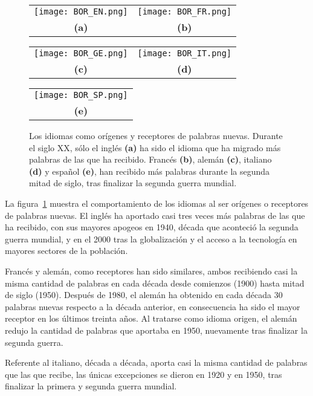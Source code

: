 \begin{figure} %
	\centering
	\begin{tabular}{cc}
		\texttt{[image: BOR\_EN.png]} &
		\texttt{[image: BOR\_FR.png]} \\
		\textbf{(a)} & \textbf{(b)}   \\
	\end{tabular}

	\begin{tabular}{cc}
		\texttt{[image: BOR\_GE.png]} &
		\texttt{[image: BOR\_IT.png]} \\
		\textbf{(c)}  & \textbf{(d)}   \\
	\end{tabular}
	\begin{tabular}{c}
		\texttt{[image: BOR\_SP.png]} \\
		\textbf{(e)} \\
	\end{tabular}
	\caption{Los idiomas como orígenes y receptores de palabras nuevas.
	Durante el siglo XX, sólo el inglés \textbf{(a)} ha sido el idioma que
	ha migrado más palabras de las que ha recibido. Francés \textbf{(b)},
	alemán \textbf{(c)}, italiano \textbf{(d)} y español \textbf{(e)}, han
	recibido más palabras durante la segunda mitad de siglo, tras finalizar
	la segunda guerra mundial. }
	\label{fig.RO_idiomas}
\end{figure} %

La figura~\ref{fig.RO_idiomas} muestra el comportamiento de los idiomas al ser
orígenes o receptores de palabras nuevas.  El inglés ha aportado casi tres
veces más palabras de las que ha recibido, con sus mayores apogeos en 1940,
década que aconteció la segunda guerra mundial,  y en el 2000 tras la
globalización y el acceso a la tecnología en mayores sectores de la población. 

Francés y alemán, como receptores han sido similares, ambos recibiendo casi la
misma cantidad de palabras en cada década desde comienzos (1900) hasta mitad de
siglo (1950). Después de 1980, el alemán ha obtenido en cada década 30 palabras nuevas respecto a la década anterior, en consecuencia ha sido el mayor receptor en los últimos treinta años. Al tratarse como idioma origen, el alemán redujo la cantidad de palabras que aportaba en 1950, nuevamente tras finalizar la segunda guerra.

Referente al italiano, década a década, aporta casi la misma cantidad de
palabras que las que recibe, las únicas excepciones se dieron en 1920 y en
1950, tras finalizar la primera y segunda guerra mundial. 

